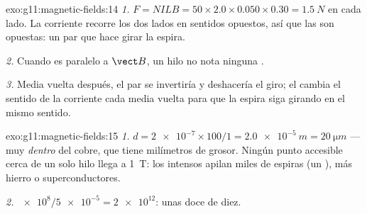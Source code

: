 \begin{solution}{exo:g11:magnetic-fields:14}
\emph{1.} $F = NILB = 50 \times 2.0 \times 0.050 \times 0.30 =
\qty{1.5}{N}$ en cada lado. La corriente recorre los dos lados en
sentidos opuestos, así que las  son opuestas: un par que hace
girar la espira.

\emph{2.} Cuando es paralelo a $\vect B$, un hilo no nota ninguna .

\emph{3.} Media vuelta después, el par se invertiría y deshacería el
giro; el  cambia el sentido de la corriente cada media vuelta
para que la espira siga girando en el mismo sentido.
\end{solution}

\begin{solution}{exo:g11:magnetic-fields:15}
\emph{1.} $d = \num{2e-7} \times 100 / 1 = \qty{2.0e-5}{m} =
\qty{20}{\micro m}$ --- muy \emph{dentro} del cobre, que tiene
milímetros de grosor. Ningún punto accesible cerca de un solo hilo llega
a \qty{1}{T}: los  intensos apilan miles de espiras (un
), más hierro o superconductores.

\emph{2.} $\num{e8} / \num{5e-5} = \num{2e12}$: unas doce  de
diez.
\end{solution}

